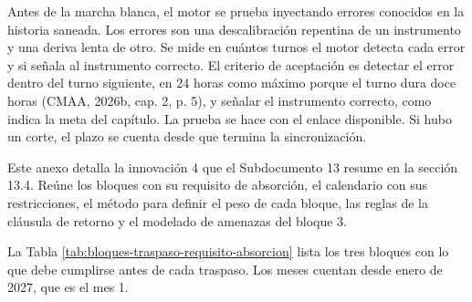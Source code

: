 \documentclass[anexo]{../../comun/overfore}
\begin{document}
Antes de la marcha blanca, el motor se prueba inyectando errores conocidos en la historia saneada. Los errores son una descalibración repentina de un instrumento y una deriva lenta de otro. Se mide en cuántos turnos el motor detecta cada error y si señala al instrumento correcto. El criterio de aceptación es detectar el error dentro del turno siguiente, en 24 horas como máximo porque el turno dura doce horas (CMAA, 2026b, cap. 2, p. 5), y señalar el instrumento correcto, como indica la meta del capítulo. La prueba se hace con el enlace disponible. Si hubo un corte, el plazo se cuenta desde que termina la sincronización.

Este anexo detalla la innovación 4 que el Subdocumento 13 resume en la sección 13.4. Reúne los bloques con su requisito de absorción, el calendario con sus restricciones, el método para definir el peso de cada bloque, las reglas de la cláusula de retorno y el modelado de amenazas del bloque 3.

La Tabla \ref{tab:bloques-traspaso-requisito-absorcion} lista los tres bloques con lo que debe cumplirse antes de cada traspaso. Los meses cuentan desde enero de 2027, que es el mes 1.
\end{document}
